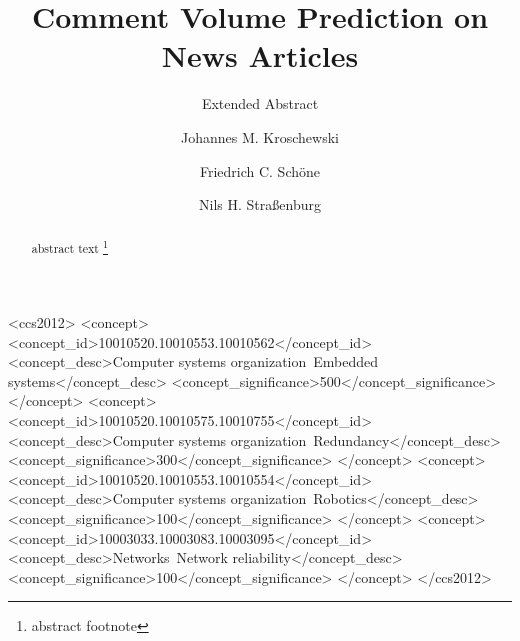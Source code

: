 \documentclass[10pt,sigconf]{acmart}
\begin{document}
\title{Comment Volume Prediction on News Articles}
\subtitle{Extended Abstract} %

\author{Johannes M. Kroschewski}

\author{Friedrich C. Schöne}

\author{Nils H. Straßenburg}

\renewcommand{\shortauthors}{M. Kroschewski et al.}


\begin{abstract}
	abstract text \footnote{abstract footnote}
\end{abstract}

%
%
\begin{CCSXML}
<ccs2012>
 <concept>
  <concept_id>10010520.10010553.10010562</concept_id>
  <concept_desc>Computer systems organization~Embedded systems</concept_desc>
  <concept_significance>500</concept_significance>
 </concept>
 <concept>
  <concept_id>10010520.10010575.10010755</concept_id>
  <concept_desc>Computer systems organization~Redundancy</concept_desc>
  <concept_significance>300</concept_significance>
 </concept>
 <concept>
  <concept_id>10010520.10010553.10010554</concept_id>
  <concept_desc>Computer systems organization~Robotics</concept_desc>
  <concept_significance>100</concept_significance>
 </concept>
 <concept>
  <concept_id>10003033.10003083.10003095</concept_id>
  <concept_desc>Networks~Network reliability</concept_desc>
  <concept_significance>100</concept_significance>
 </concept>
</ccs2012>  
\end{CCSXML}
\end{document}
